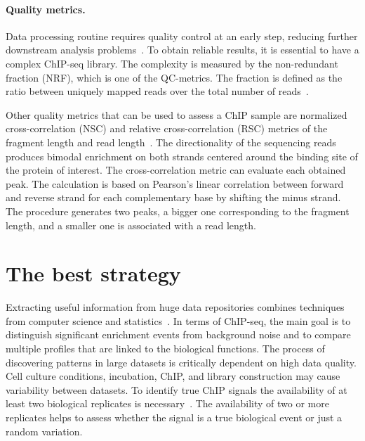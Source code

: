 \paragraph{Quality metrics.}
Data processing routine requires quality control at an early step, reducing further downstream analysis problems~\cite{ewels2016multiqc}.
To obtain reliable results, it is essential to have a complex ChIP-seq library.
The complexity is measured by the non-redundant fraction (NRF), which is one of the QC-metrics.
The fraction is defined as the ratio between uniquely mapped reads over the total number of reads~\cite{landt2012chip}.

Other quality metrics that can be used to assess a ChIP sample are normalized cross-correlation (NSC) and relative cross-correlation (RSC) metrics of the fragment length and read length~\cite{landt2012chip, marinov2014large}. 
The directionality of the sequencing reads produces bimodal enrichment on both strands centered around the binding site of the protein of interest. 
The cross-correlation metric can evaluate each obtained peak. 
The calculation is based on Pearson's linear correlation between forward and reverse strand for each complementary base by shifting the minus strand. 
The procedure generates two peaks, a bigger one corresponding to the fragment length, and a smaller one is associated with a read length. 



\section{The best strategy}
\label{strategy}

Extracting useful information from huge data repositories combines techniques from computer science and statistics~\cite{friedman2001elements}. 
In terms of ChIP-seq, the main goal is to distinguish significant enrichment events from background noise and to compare multiple profiles that are linked to the biological functions. 
The process of discovering patterns in large datasets is critically dependent on high data quality. 
Cell culture conditions, incubation, ChIP, and library construction may cause variability between datasets. 
To identify true ChIP signals the availability of at least two biological replicates is necessary~\cite{kidder2011chip}. 
The availability of two or more replicates helps to assess whether the signal is a true biological event or just a random variation. 

